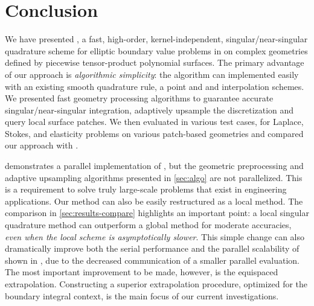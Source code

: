 \section{Conclusion\label{sec:conclusion}}
We have presented \qbkix, a fast, high-order, kernel-independent, singular/near-singular quadrature scheme for elliptic boundary value problems in \threed on complex geometries defined by piecewise tensor-product polynomial surfaces.
The primary advantage of our approach is \textit{algorithmic simplicity}: the algorithm can implemented easily with an existing smooth quadrature rule, a point \fmm and \oned and \twod interpolation schemes.
We presented fast geometry processing algorithms to guarantee accurate singular/near-singular integration, adaptively upsample the discretization and query local surface patches.
We then evaluated \qbkix in various test cases, for Laplace, Stokes, and elasticity problems on various patch-based geometries and compared our approach with \cite{YBZ}.

\cite{lu2019scalable} demonstrates a parallel implementation of \qbkix, but the geometric preprocessing and adaptive upsampling algorithms presented in \cref{sec:algo} are not parallelized.
This is a requirement to solve truly large-scale problems that exist in engineering applications.
Our method can also be easily restructured as a local method.
The comparison in \cref{sec:results-compare} highlights an important point: a local singular quadrature method can outperform a global method for moderate accuracies, \textit{even when the local scheme is asymptotically slower}.
This simple change can also dramatically improve both the serial performance and the parallel scalability of \qbkix shown in \cite{lu2019scalable}, due to the decreased communication of a smaller parallel \fmm evaluation.
The most important improvement to be made, however, is the equispaced extrapolation.
Constructing a superior extrapolation procedure, optimized for the boundary integral context, is the main focus of our current investigations.

\iffalse
\section{Acknowledgements}
We would like to thank Michael O'Neil, Dhairya Malhotra, Libin Lu, Alex Barnett, Leslie Greengard, Michael Shelley for insightful conversations, feedback and suggestions regarding this work. 
We would also like to thank the NYU HPC team, and Shenglong Wang in particular, for great support throughout the course of this work.
This work was supported by NSF grant DMS-1821334.
\fi
